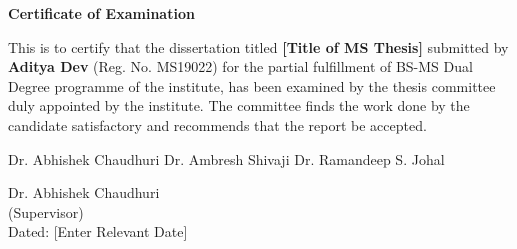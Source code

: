 \begin{center}
    \textbf{\Large Certificate of Examination}
\end{center}

This is to certify that the dissertation titled \textbf{[Title of MS Thesis]} submitted by 
\textbf{Aditya Dev} (Reg. No. MS19022) for the partial fulfillment of BS-MS Dual Degree 
programme of the institute, has been examined by the thesis committee duly appointed by the 
institute. The committee finds the work done by the candidate satisfactory and recommends 
that the report be accepted.

\vspace{4cm}

Dr. Abhishek Chaudhuri \hspace{0.9cm} Dr. Ambresh Shivaji \hspace{0.9cm} Dr. Ramandeep S. Johal

\vspace{4cm}

\begin{flushright}
    Dr. Abhishek Chaudhuri
    \\
    (Supervisor)
    \\
    \vspace{4cm}
    Dated: [Enter Relevant Date]
\end{flushright}